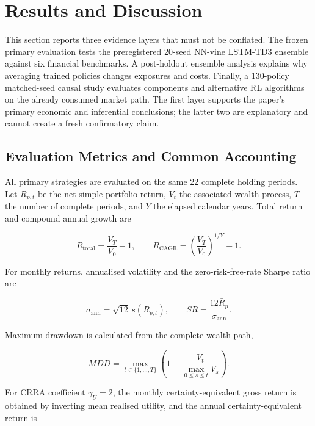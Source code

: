\section{Results and Discussion}
\label{sec:results}

This section reports three evidence layers that must not be conflated. The frozen primary evaluation tests the preregistered 20-seed NN-vine LSTM-TD3 ensemble against six financial benchmarks. A post-holdout ensemble analysis explains why averaging trained policies changes exposures and costs. Finally, a 130-policy matched-seed causal study evaluates components and alternative RL algorithms on the already consumed market path. The first layer supports the paper's primary economic and inferential conclusions; the latter two are explanatory and cannot create a fresh confirmatory claim.

\subsection{Evaluation Metrics and Common Accounting}
\label{subsec:4_metrics}

All primary strategies are evaluated on the same 22 complete holding periods. Let $R_{p,t}$ be the net simple portfolio return, $V_t$ the associated wealth process, $T$ the number of complete periods, and $Y$ the elapsed calendar years. Total return and compound annual growth are

\begin{equation}
R_{\mathrm{total}}=\frac{V_T}{V_0}-1,
\qquad
R_{\mathrm{CAGR}}=\left(\frac{V_T}{V_0}\right)^{1/Y}-1.
\label{eq:annualized_return}
\end{equation}

For monthly returns, annualised volatility and the zero-risk-free-rate Sharpe ratio are

\begin{equation}
\sigma_{\mathrm{ann}}=\sqrt{12}\,s(R_{p,t}),
\qquad
SR=\frac{12\bar R_p}{\sigma_{\mathrm{ann}}}.
\label{eq:sharpe_ratio}
\end{equation}

Maximum drawdown is calculated from the complete wealth path,

\begin{equation}
MDD=\max_{t\in\{1,\ldots,T\}}
\left(1-\frac{V_t}{\max_{0\leq s\leq t}V_s}\right).
\label{eq:max_drawdown}
\end{equation}

For CRRA coefficient $\gamma_U=2$, the monthly certainty-equivalent gross return is obtained by inverting mean realised utility, and the annual certainty-equivalent return is

